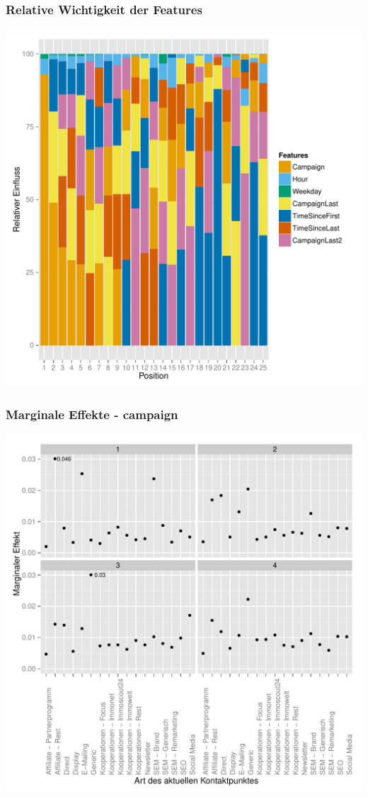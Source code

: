\begin{frame}\frametitle{Relative Wichtigkeit der Features}
	\centering\includegraphics[scale=0.3]{variableImportance.pdf}
\end{frame}

\begin{frame}\frametitle{Marginale Effekte - campaign}
	\centering\includegraphics[scale=0.3]{marg_eff_campaign.pdf}
\end{frame}


